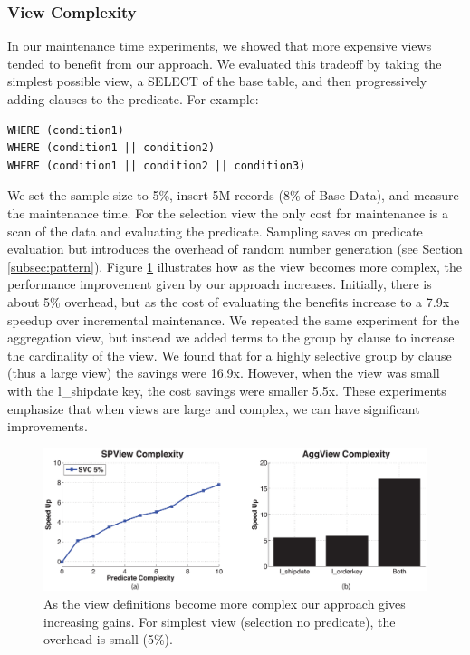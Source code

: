 \subsubsection{View Complexity}
In our maintenance time experiments, we showed that more expensive views tended to benefit from our approach.
We evaluated this tradeoff by taking the simplest possible view, a SELECT of the base table, and then progressively adding clauses to the predicate.
For example:
\begin{lstlisting}
WHERE (condition1)
WHERE (condition1 || condition2)
WHERE (condition1 || condition2 || condition3)
\end{lstlisting}
We set the sample size to 5\%, insert 5M records (8\% of Base Data), and measure the maintenance time.
For the selection view the only cost for maintenance is a scan of the data and evaluating the predicate. 
Sampling saves on predicate evaluation but introduces the overhead of random number generation (see Section \ref{subsec:pattern}). 
Figure \ref{exp11overheads} illustrates how as the view becomes more complex, the performance improvement given
by our approach increases.
Initially, there is about 5\% overhead, but as the cost of evaluating the benefits increase to a 7.9x speedup over incremental maintenance.
We repeated the same experiment for the aggregation view, but instead we added terms to the group by clause to increase the
cardinality of the view.
We found that for a highly selective group by clause (thus a large view) the savings were 16.9x.
However, when the view was small with the l\_shipdate key, the cost savings were smaller 5.5x.
These experiments emphasize that when views are large and complex, we can have significant improvements.
\begin{figure}[!t]
 \includegraphics[trim = 35mm 0mm 35mm 0mm, clip,width=\columnwidth]{exp/complexity_efficiency_tradeoff.eps}\vspace{-1em}
 \caption{As the view definitions become more complex our approach gives increasing gains. For simplest view (selection no predicate), the overhead is small (5\%).\label{exp11overheads}}\vspace{-1em}
\end{figure}

